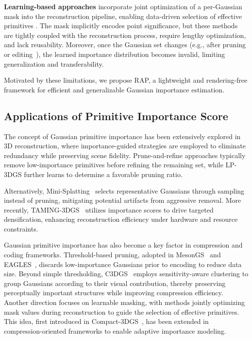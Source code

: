 \textbf{Learning-based approaches} incorporate joint optimization of a per-Gaussian mask into the reconstruction pipeline, enabling data-driven selection of effective primitives \cite{compact,hac,hacpp,contextgs,maskgaussian}.
The mask implicitly encodes point significance, but these methods are tightly coupled with the reconstruction process, require lengthy optimization, and lack reusability. 
Moreover, once the Gaussian set changes (e.g., after pruning or editing~\cite{gaussianeditor, grouping,vc_edit}), the learned importance distribution becomes invalid, limiting generalization and transferability.

Motivated by these limitations, we propose RAP, a lightweight and rendering-free framework for efficient and generalizable Gaussian importance estimation.

\subsection{Applications of Primitive Importance Score}
\label{sec:app}
The concept of Gaussian primitive importance has been extensively explored in 3D reconstruction, where importance-guided strategies are employed to eliminate redundancy while preserving scene fidelity.
Prune-and-refine approaches \cite{lightgaussian,pup,hybridgs} typically remove low-importance primitives before refining the remaining set, while LP-3DGS \cite{lp3dgs} further learns to determine a favorable pruning ratio.

Alternatively, Mini-Splatting~\cite{minisplatting} selects representative Gaussians through sampling instead of pruning, mitigating potential artifacts from aggressive removal.
More recently, TAMING-3DGS~\cite{taming3dgs} utilizes importance scores to drive targeted densification, enhancing reconstruction efficiency under hardware and resource constraints.

Gaussian primitive importance has also become a key factor in compression and coding frameworks. 
Threshold-based pruning, adopted in MesonGS~\cite{mesongs} and EAGLES~\cite{eagles}, discards low-importance Gaussians prior to encoding to reduce data size. 
Beyond simple thresholding, C3DGS~\cite{c3dgs} employs sensitivity-aware clustering to group Gaussians according to their visual contribution, thereby preserving perceptually important structures while improving compression efficiency. 
Another direction focuses on learnable masking, with methods \cite{hac,hacpp,contextgs,maskgaussian} jointly optimizing mask values during reconstruction to guide the selection of effective primitives.
This idea, first introduced in Compact-3DGS~\cite{compact}, has  been extended in compression-oriented frameworks to enable adaptive importance modeling.

